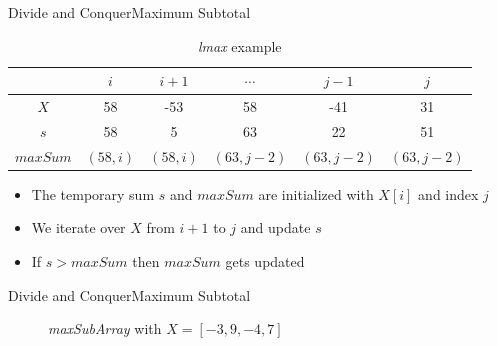 \begin{frame}{Divide and Conquer}{Maximum Subtotal}
  \begin{table}
    \caption{\textit{lmax} example}
    \label{fig:divide_and_conquer:lmax_example}
    \begin{tabular}{c|ccccc}
      {} & $i$ & $i+1$ & $\cdots$ & $j-1$ & $j$\\
      \midrule
      $X$ & 58 & -53 & 58 & -41 & 31\\
      \midrule
       {\color{Mittel-Blau}$s$} & 58 & 5 & 63 & 22 & 51\\
      {\color{Mittel-Blau}$maxSum$} &
      $(58, i)$ & $(58, i)$ & $(63, j-2)$ & $(63, j-2)$ & $(63, j-2)$
    \end{tabular}
  \end{table}
  \begin{itemize}
    \item
      The temporary sum {\color{Mittel-Blau}$s$} and
      {\color{Mittel-Blau}$maxSum$} are initialized with $X[i]$ and index $j$
    \item
      We {\color{Mittel-Blau}iterate over $X$ from $i+1$ to $j$} and
      {\color{Mittel-Blau}update $s$}
    \item
      If {\color{Mittel-Blau}$s > maxSum$} then {\color{Mittel-Blau}$maxSum$}
      gets updated
  \end{itemize}
\end{frame}


\begin{frame}{Divide and Conquer}{Maximum Subtotal}
  \begin{figure}
    \begin{adjustbox}{width=\linewidth}
      
    \end{adjustbox}
    \caption{\textit{maxSubArray} with $X = [-3, 9, -4, 7]$}
    \label{fig:divide_and_conquer:max_sub_array_example}
  \end{figure}
\end{frame}



